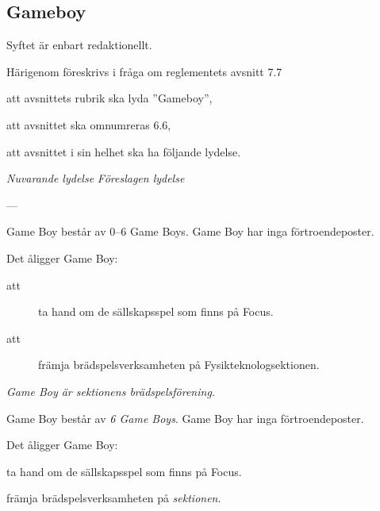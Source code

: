 \documentclass{article}
\newenvironment{lydelse}
    {\begin{paracol}{2}%
        \emph{Nuvarande lydelse}%
        \switchcolumn%
        \emph{Föreslagen lydelse}%
    \end{paracol}%
    \begin{enumerate}[label=\thesubsection.\arabic*]%
    \begin{paracol}{2}%
    }{\end{paracol}\end{enumerate}}
\begin{document}
\subsection{Gameboy}
Syftet är enbart redaktionellt.

Härigenom föreskrivs i fråga om reglementets avsnitt 7.7

\begin{dels}
    \item att avsnittets rubrik ska lyda ''Gameboy'',
    \item att avsnittet ska omnumreras 6.6,
    \item att avsnittet i sin helhet ska ha följande lydelse.
\end{dels}

\begin{lydelse}
    \setcounter{section}{7}
    \setcounter{subsection}{7}
    
    \item[] ---
    
    \item Game Boy består av 0--6 Game Boys. Game Boy har inga förtroendeposter.
    
    \item Det åligger Game Boy:
    \begin{description}
        \item[att] ta hand om de sällskapsspel som finns på Focus.
        \item[att] främja brädspelsverksamheten på Fysikteknologsektionen.
    \end{description}
		
    \setcounter{section}{6}
    \setcounter{subsection}{6}
    \switchcolumn
    
    \item \emph{Game Boy är sektionens brädspelsförening.}

    \item Game Boy består av \emph{6 Game Boys}. Game Boy har inga förtroendeposter.
    	    
    \item Det åligger Game Boy:
    \begin{aligganden}
        \vspace{-0.4em}
        \item ta hand om de sällskapsspel som finns på Focus.\vspace{0.2em}
    	\item främja brädspelsverksamheten på \emph{sektionen}.
    \end{aligganden}
    
\end{lydelse}
\end{document}
